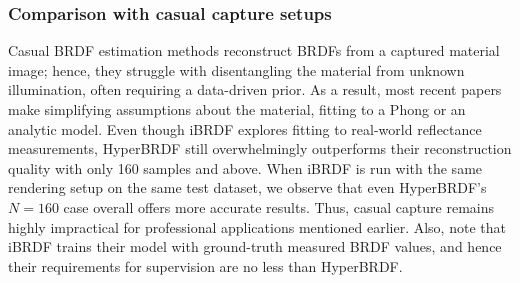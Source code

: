 \begin{table}[ht]
    \centering
    \caption{Hypernetwork - Average metric results across varying sample sizes ($N$) over the test set (Sparse and full reconstruction of unseen materials).}

    \label{table: ours_large_samples}
\end{table}


\subsubsection{Comparison with casual capture setups}
Casual \gls{BRDF} estimation methods reconstruct \gls{BRDF}s from a captured material image; hence, they struggle with disentangling the material from unknown illumination, often requiring a data-driven prior. As a result, most recent papers make simplifying assumptions about the material, fitting to a Phong or an analytic model. Even though iBRDF \cite{chen2021invertible} explores fitting to real-world reflectance measurements, HyperBRDF still overwhelmingly outperforms their reconstruction quality with only 160 samples and above. When iBRDF is run with the same rendering setup on the same test dataset, we observe that even HyperBRDF's $N=160$ case overall offers more accurate results. Thus, casual capture remains highly impractical for professional applications mentioned earlier. Also, note that iBRDF trains their model with ground-truth measured \gls{BRDF} values, and hence their requirements for supervision are no less than HyperBRDF. 


